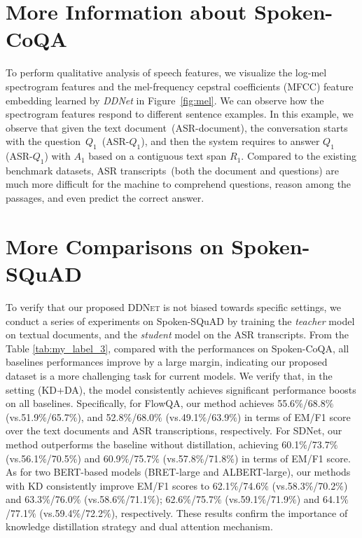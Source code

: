 \documentclass[11pt]{article}
\begin{document}
\section{More Information about Spoken-CoQA}
\label{supp:morecompare-scoqa}
To perform qualitative analysis of speech features, we visualize the log-mel spectrogram features and the mel-frequency cepstral coefficients (MFCC) feature embedding learned by \textit{DDNet} in Figure~\ref{fig:mel}. We can observe how the spectrogram features respond to different sentence examples. In this example, we observe that given the text document~(ASR-document), the conversation starts with the question~$Q_1$~(ASR-$Q_1$), and then the system requires to answer $Q_1$ (ASR-$Q_1$) with $A_1$ based on a contiguous text span $R_1$. Compared to the existing benchmark datasets, ASR transcripts~(both the document and questions) are much more difficult for the machine to comprehend questions, reason among the passages, and even predict the correct answer.

\section{More Comparisons on Spoken-SQuAD}
\label{supp:morecompare-squad}
To verify that our proposed \textsc{DDNet} is not biased towards specific settings, we conduct a series of experiments on Spoken-SQuAD \cite{li2018spoken} by training the \textit{teacher} model on textual documents, and the \textit{student} model on the ASR transcripts. From the Table \ref{tab:my_label_3}, compared with the performances on Spoken-CoQA, all baselines performances improve by a large margin, indicating our proposed dataset is a more challenging task for current models. We verify that, in the setting (KD+DA), the model consistently achieves significant performance boosts on all baselines. Specifically, for FlowQA, our method achieves 55.6$\%$/68.8$\%$ (vs.51.9$\%$/65.7$\%$), and 52.8$\%$/68.0$\%$ (vs.49.1$\%$/63.9$\%$) in terms of EM/F1 score over the text documents and ASR transcriptions, respectively. For SDNet, our method outperforms the baseline without distillation, achieving 60.1$\%$/73.7$\%$ (vs.56.1$\%$/70.5$\%$) and 60.9$\%$/75.7$\%$ (vs.57.8$\%$/71.8$\%$) in terms of EM/F1 score. As for two BERT-based models (BRET-large and ALBERT-large), our methods with KD consistently improve EM/F1 scores to 62.1$\%$/74.6$\%$ (vs.58.3$\%$/70.2$\%$) and 63.3$\%$/76.0$\%$ (vs.58.6$\%$/71.1$\%$); 62.6$\%$/75.7$\%$ (vs.59.1$\%$/71.9$\%$) and 64.1$\%$/77.1$\%$ (vs.59.4$\%$/72.2$\%$), respectively. These results confirm the importance of knowledge distillation strategy and dual attention mechanism.
\end{document}
